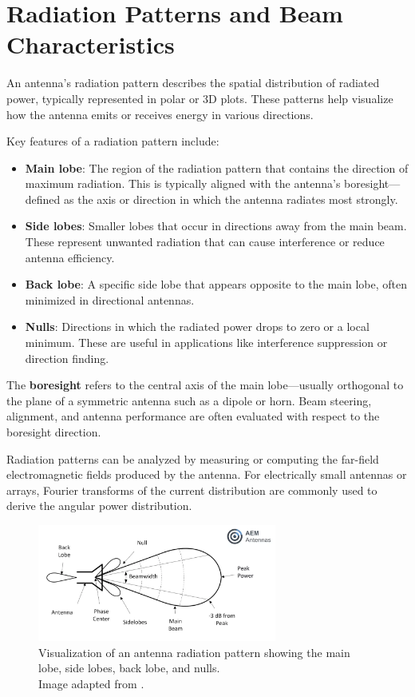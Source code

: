 \section{Radiation Patterns and Beam Characteristics}

An antenna’s radiation pattern describes the spatial distribution of radiated power, typically represented in polar or 3D plots. These patterns help visualize how the antenna emits or receives energy in various directions.

Key features of a radiation pattern include:

\begin{itemize}
    \item \textbf{Main lobe}: The region of the radiation pattern that contains the direction of maximum radiation. This is typically aligned with the antenna’s boresight—defined as the axis or direction in which the antenna radiates most strongly.
    
    \item \textbf{Side lobes}: Smaller lobes that occur in directions away from the main beam. These represent unwanted radiation that can cause interference or reduce antenna efficiency.
    
    \item \textbf{Back lobe}: A specific side lobe that appears opposite to the main lobe, often minimized in directional antennas.
    
    \item \textbf{Nulls}: Directions in which the radiated power drops to zero or a local minimum. These are useful in applications like interference suppression or direction finding.
\end{itemize}

The \textbf{boresight} refers to the central axis of the main lobe—usually orthogonal to the plane of a symmetric antenna such as a dipole or horn. Beam steering, alignment, and antenna performance are often evaluated with respect to the boresight direction.

Radiation patterns can be analyzed by measuring or computing the far-field electromagnetic fields produced by the antenna. For electrically small antennas or arrays, Fourier transforms of the current distribution are commonly used to derive the angular power distribution.

\begin{figure}[H]
    \centering
    \includegraphics[width=0.7\textwidth]{figures/lobe.png}
    \caption{Visualization of an antenna radiation pattern showing the main lobe, side lobes, back lobe, and nulls.\\[0.5em]
    \small Image adapted from \cite{aemterms}.}
    \label{fig:lobes-pattern}
\end{figure}

